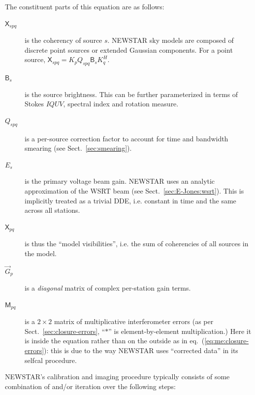 \documentclass[]{aa}
\newcommand{\herm}{H}
\newcommand{\jones}[2]{\vec {#1}_{#2}}
\newcommand{\coh}[2]{\mathsf{{#1}}_{{#2}}}
\begin{document}
The constituent parts of this equation are as follows:
\begin{description}
\item[$\coh{X}{spq}$] is the coherency of source $s$. NEWSTAR sky models are composed of discrete point sources or extended Gaussian components. For a point source, $\coh{X}{spq} = K_p Q_{spq} \coh{B}{s} K^\herm_q$.

\item[$\coh{B}{s}$] is the source brightness. This can be further parameterized in terms of Stokes $IQUV$, spectral index and rotation measure.

\item[$Q_{spq}$] is a per-source correction factor to account for time and bandwidth smearing (see Sect.~\ref{sec:smearing}).

\item[$E_s$] is the primary voltage beam gain. NEWSTAR uses an analytic approximation of the WSRT beam (see Sect.~\ref{sec:E-Jones:wsrt}). This is implicitly treated as a trivial DDE, i.e. constant in time and the same across all stations.

\item[$\coh{X}{pq}$] is thus the ``model visibilities'', i.e. the sum of coherencies of all sources in the model.

\item[$\jones{G}{p}$] is a {\em diagonal} matrix of complex per-station gain terms.

\item[$\coh{M}{pq}$] is a $2\times2$ matrix of multiplicative interferometer errors (as per Sect.~\ref{sec:closure-errors}, ``$\ast$'' is element-by-element multiplication.) Here it is inside the equation rather than on the outside as in eq.~(\ref{eq:me:closure-errors}): this is due to the way NEWSTAR uses ``corrected data'' in its selfcal procedure.%

\end{description}

NEWSTAR's calibration and imaging procedure typically consists of some combination of and/or iteration over the following steps:
\end{document}
